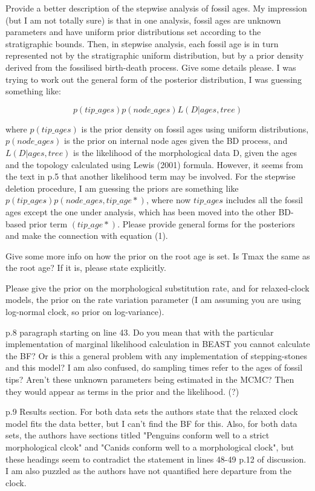\documentclass[11pt]{article}
\begin{document}
Provide a better description of the stepwise analysis of fossil ages. My impression (but I am not totally sure) is that in one analysis, fossil ages are unknown parameters and have uniform prior distributions set according to the stratigraphic bounds. Then, in stepwise analysis, each fossil age is in turn represented not by the stratigraphic uniform distribution, but by a prior density derived from the fossilised birth-death process. Give some details please. I was trying to work out the general form of the posterior distribution, I was guessing something like:

$$p(tip\_ages) p(node\_ages) L(D|ages,tree)$$

where $p(tip\_ages)$ is the prior density on fossil ages using uniform distributions, $p(node\_ages)$ is the prior on internal node ages given the BD process, and $L(D|ages,tree)$ is the likelihood of the morphological data D, given the ages and the topology calculated using Lewis (2001) formula. However, it seems from the text in p.5 that another likelihood term may be involved. For the stepwise deletion procedure, I am guessing the priors are something like $p(tip\_ages\hat{}) p(node\_ages, tip\_age*)$, where now $tip\_ages\hat{}$ includes all the fossil ages except the one under analysis, which has been moved into the other BD-based prior term $(tip\_age*)$. Please provide general forms for the posteriors and make the connection with equation (1).

Give some more info on how the prior on the root age is set. Is Tmax the same as the root age? If it is, please state explicitly.

Please give the prior on the morphological substitution rate, and for relaxed-clock models, the prior on the rate variation parameter (I am assuming you are using log-normal clock, so prior on log-variance).

p.8 paragraph starting on line 43. Do you mean that with the particular implementation of marginal likelihood calculation in BEAST you cannot calculate the BF? Or is this a general problem with any implementation of stepping-stones and this model? I am also confused, do sampling times refer to the ages of fossil tips? Aren't these unknown parameters being estimated in the MCMC? Then they would appear as terms in the prior and the likelihood. (?)

p.9 Results section. For both data sets the authors state that the relaxed clock model fits the data better, but I can't find the BF for this. Also, for both data sets, the authors have sections titled "Penguins conform well to a strict morphological clcok" and "Canids conform well to a morphological clock", but these headings seem to contradict the statement in lines 48-49 p.12 of discussion. I am also puzzled as the authors have not quantified here departure from the clock. 
\end{document}
